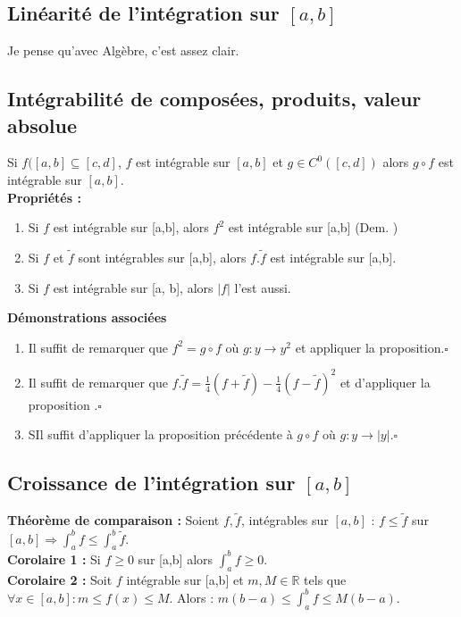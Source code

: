 \documentclass[11pt, a4paper, openany]{book}
\begin{document}
\subsection{Linéarité de l'intégration sur $[a,b]$} 
Je pense qu'avec Algèbre, c'est assez clair.

\subsection{Intégrabilité de composées, produits, valeur absolue}
Si $f([a,b] \subseteq [c,d]$, $f$ est intégrable sur $[a,b]$ et $g \in C^0([c,d])$ alors $g \circ f$ est intégrable sur $[a,b]$.\\

\textbf{Propriétés :}
\begin{enumerate}
	\item Si $f$ est intégrable sur [a,b], alors $f^2$ est intégrable sur [a,b] (Dem. )
	\item Si $f$ et $\tilde{f}$ sont intégrables sur [a,b], alors $f . \tilde{f}$ est intégrable sur [a,b].
	\item Si $f$ est intégrable sur [a, b], alors $|f|$ l'est aussi.
\end{enumerate}
\textbf{Démonstrations associées}
\begin{enumerate}
	\item Il suffit de remarquer que $f^2 = g \circ f$ où $g : y \rightarrow y^2$ et appliquer la proposition.$\square$
	\item Il suffit de remarquer que $f . \tilde{f} = \frac{1}{4}(f + \tilde{f}) - \frac{1}{4}(f - \tilde{f})^2$ et d'appliquer la proposition .$\square$
	\item SIl suffit d'appliquer la proposition précédente à $g \circ f$ où $g : y \rightarrow |y|$.$\square$
\end{enumerate}

\subsection{Croissance de l'intégration sur $[a,b]$}
\textbf{Théorème de comparaison :} Soient $f, \tilde{f}$, intégrables sur $[a,b]$ : $f \leq \tilde{f}$ sur $[a, b] \Rightarrow \int_a^b f \leq \int_a^b \tilde{f}$.\\

\textbf{Corolaire 1 :} Si $f \geq 0$ sur [a,b] alors $\int_a^b f \geq 0$.\\

\textbf{Corolaire 2 :} Soit $f$ intégrable sur [a,b] et $m, M \in \mathbb{R}$ tels que $\forall x \in [a, b] : m \leq f(x) \leq M$. Alors : $m(b-a) \leq \int_a^b f \leq M(b-a)$.\\
\end{document}
